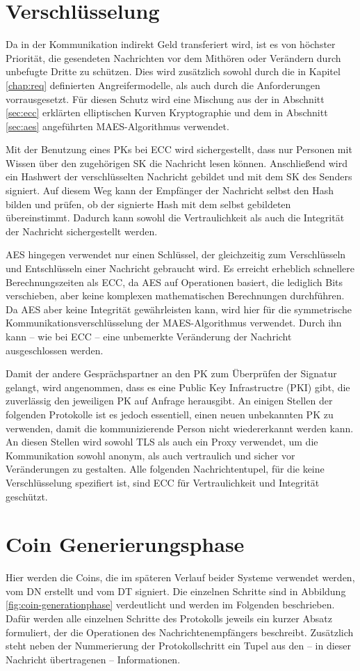 \documentclass[
	fontsize=11pt,
	headings=small,
	parskip=half,           %
	bibliography=totoc,
	numbers=noenddot,       %
	open=any,               %
]{scrreprt}
\begin{document}
\section{Verschlüsselung}
Da in der Kommunikation indirekt Geld transferiert wird, ist es von höchster Priorität, die gesendeten Nachrichten vor dem Mithören oder Verändern durch unbefugte Dritte zu schützen. Dies wird zusätzlich sowohl durch die in Kapitel \ref{chap:req} definierten Angreifermodelle, als auch durch die Anforderungen vorrausgesetzt. Für diesen Schutz wird eine Mischung aus der in Abschnitt \ref{sec:ecc} erklärten elliptischen Kurven Kryptographie und dem in Abschnitt \ref{sec:aes} angeführten MAES-Algorithmus verwendet. 

Mit der Benutzung eines PKs bei ECC wird sichergestellt, dass nur Personen mit Wissen über den zugehörigen SK die Nachricht lesen können. Anschließend wird ein Hashwert der verschlüsselten Nachricht gebildet und mit dem SK des Senders signiert. Auf diesem Weg kann der Empfänger der Nachricht selbst den Hash bilden und prüfen, ob der signierte Hash mit dem selbst gebildeten übereinstimmt. Dadurch kann sowohl die Vertraulichkeit als auch die Integrität der Nachricht sichergestellt werden.

AES hingegen verwendet nur einen Schlüssel, der gleichzeitig zum Verschlüsseln und Entschlüsseln einer Nachricht gebraucht wird. Es erreicht erheblich schnellere Berechnungszeiten als ECC, da AES auf Operationen basiert, die lediglich Bits verschieben, aber keine komplexen mathematischen Berechnungen durchführen. Da AES aber keine Integrität gewährleisten kann, wird hier für die symmetrische Kommunikationsverschlüsselung der MAES-Algorithmus verwendet. Durch ihn kann -- wie bei ECC -- eine unbemerkte Veränderung der Nachricht ausgeschlossen werden.

Damit der andere Gesprächspartner an den PK zum Überprüfen der Signatur gelangt, wird angenommen, dass es eine Public Key Infrastructre (PKI) gibt, die zuverlässig den jeweiligen PK auf Anfrage herausgibt. An einigen Stellen der folgenden Protokolle ist es jedoch essentiell, einen neuen unbekannten PK zu verwenden, damit die kommunizierende Person nicht wiedererkannt werden kann. An diesen Stellen wird sowohl TLS als auch ein Proxy verwendet, um die Kommunikation sowohl anonym, als auch vertraulich und sicher vor Veränderungen zu gestalten. Alle folgenden Nachrichtentupel, für die keine Verschlüsselung spezifiert ist, sind ECC für Vertraulichkeit und Integrität geschützt.

\section{Coin Generierungsphase}
\label{system:coingeneration}
Hier werden die Coins, die im späteren Verlauf beider Systeme verwendet werden, vom DN erstellt und vom DT signiert. Die einzelnen Schritte sind in Abbildung \ref{fig:coin-generationphase} verdeutlicht und werden im Folgenden beschrieben. Dafür werden alle einzelnen Schritte des Protokolls jeweils ein kurzer Absatz formuliert, der die Operationen des Nachrichtenempfängers beschreibt. Zusätzlich steht neben der Nummerierung der Protokollschritt ein Tupel aus den -- in dieser Nachricht übertragenen -- Informationen.
\end{document}
